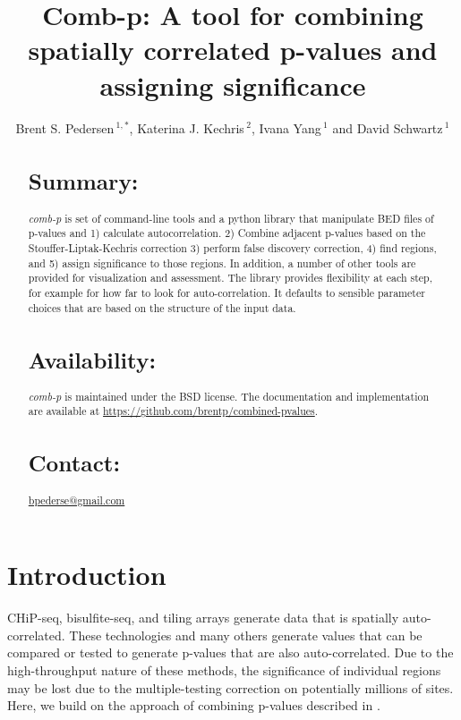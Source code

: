 \documentclass{bioinfo}
\begin{document}

\title[comb-p]{Comb-p: A tool for combining spatially correlated p-values and assigning significance}
\author[Pedersen \textit{et~al}]{Brent S. Pedersen\,$^{1,*}$, Katerina J. Kechris\,$^{2}$,
    Ivana Yang\,$^{1}$ and David Schwartz\,$^1$}
\address{$^{1}$Department of Medicine, University of Colorado, Denver, Anschutz Medical Campus, Aurora CO 80045, USA\\
$^{2}$Department of Statistics, University of Colorado, Denver, Anschutz Medical Campus, Aurora CO 80045, USA\\
}
\maketitle
\begin{abstract}

\section{Summary:}
\textit{comb-p} is set of command-line tools and a python library that
manipulate BED files of p-values and 1) calculate autocorrelation. 2) Combine
adjacent p-values based on the Stouffer-Liptak-Kechris correction \citep{Kechris2010}
3) perform false discovery correction, 4) find regions, and 5) assign
significance to those regions. In addition, a number of other tools are provided
for visualization and assessment. The library provides flexibility at each
step, for example for how far to look for auto-correlation. It defaults to
sensible parameter choices that are based on the structure of the input data.

\section{Availability:}
 \textit{comb-p} is maintained under the BSD license. The documentation and
 implementation are available at
 \href{https://github.com/brentp/combined-pvalues}{https://github.com/brentp/combined-pvalues}.
\section{Contact:} \href{bpederse@gmail.com}{bpederse@gmail.com}
\end{abstract}

\section{Introduction}
CHiP-seq, bisulfite-seq, and tiling arrays generate data that is spatially
auto-correlated. These technologies and many others generate values that can be
compared or tested to generate p-values that are also auto-correlated. Due to the
high-throughput nature of these methods, the significance of individual regions
may be lost due to the multiple-testing correction on potentially millions of sites.
Here, we build on the approach of combining p-values described in \citep{Kechris2010}.
\end{document}
